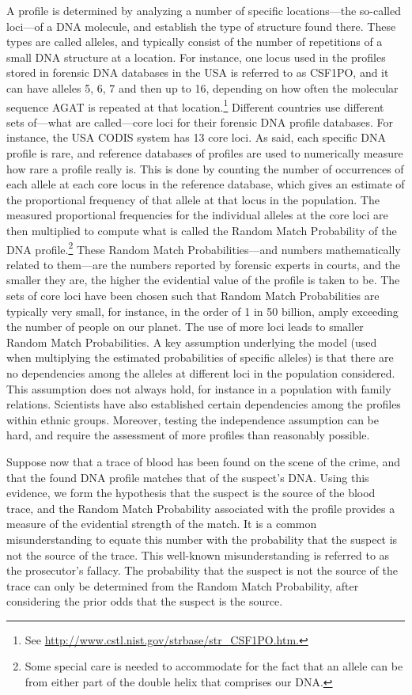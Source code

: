 \documentclass[10pt]{article}
\begin{document}
A profile is determined by analyzing a number of specific locations---the so-called loci---of a DNA molecule, and establish the type of structure found there. These types are called alleles, and typically consist of the number of repetitions of a small DNA structure at a location. For instance, one locus used in the profiles stored in forensic DNA databases in the USA is referred to as CSF1PO, and it can have alleles 5, 6, 7 and then up to 16, depending on how often the molecular sequence AGAT is repeated at that location.\footnote{See \url{http://www.cstl.nist.gov/strbase/str\_CSF1PO.htm.}} Different countries use different sets of---what are called---core loci for their forensic DNA profile databases. For instance, the USA CODIS system has 13 core loci. As said, each specific DNA profile is rare, and reference databases of profiles are used to numerically measure how rare a profile really is. This is done by counting the number of occurrences of each allele at each core locus in the reference database, which gives an estimate of the proportional frequency of that allele at that locus in the population. The measured proportional frequencies for the individual alleles at the core loci are then multiplied to compute what is called the Random Match Probability of the DNA profile.\footnote{Some special care is needed to accommodate for the fact that an allele can be from either part of the double helix that comprises our DNA.} These Random Match Probabilities---and numbers mathematically related to them---are the numbers reported by forensic experts in courts, and the smaller they are, the higher the evidential value of the profile is taken to be. The sets of core loci have been chosen such that Random Match Probabilities are typically very small, for instance, in the order of 1 in 50 billion, amply exceeding the number of people on our planet. The use of more loci leads to smaller Random Match Probabilities. A key assumption underlying the model (used when multiplying the estimated probabilities of specific alleles) is that there are no dependencies among the alleles at different loci in the population considered. This assumption does not always hold, for instance in a population with family relations. Scientists have also established certain dependencies among the profiles within ethnic groups. Moreover, testing the independence assumption can be hard, and require the assessment of more profiles than reasonably possible.

Suppose now that a trace of blood has been found on the scene of the crime, and that the found DNA profile matches that of the suspect's DNA. Using this evidence, we form the hypothesis that the suspect is the source of the blood trace, and the Random Match Probability associated with the profile provides a measure of the evidential strength of the match. It is a common misunderstanding to equate this number with the probability that the suspect is not the source of the trace. This well-known misunderstanding is referred to as the prosecutor's fallacy. The probability that the suspect is not the source of the trace can only be determined from the Random Match Probability, after considering the prior odds that the suspect is the source.
\end{document}
